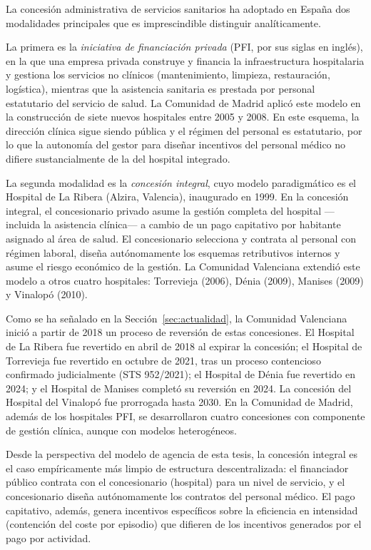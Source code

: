 La concesión administrativa de servicios sanitarios ha adoptado en España dos modalidades principales que es imprescindible distinguir analíticamente.

La primera es la \textit{iniciativa de financiación privada} (PFI, por sus siglas en inglés), en la que una empresa privada construye y financia la infraestructura hospitalaria y gestiona los servicios no clínicos (mantenimiento, limpieza, restauración, logística), mientras que la asistencia sanitaria es prestada por personal estatutario del servicio de salud. La Comunidad de Madrid aplicó este modelo en la construcción de siete nuevos hospitales entre 2005 y 2008. En este esquema, la dirección clínica sigue siendo pública y el régimen del personal es estatutario, por lo que la autonomía del gestor para diseñar incentivos del personal médico no difiere sustancialmente de la del hospital integrado.

La segunda modalidad es la \textit{concesión integral}, cuyo modelo paradigmático es el Hospital de La Ribera (Alzira, Valencia), inaugurado en 1999. En la concesión integral, el concesionario privado asume la gestión completa del hospital ---incluida la asistencia clínica--- a cambio de un pago capitativo por habitante asignado al área de salud. El concesionario selecciona y contrata al personal con régimen laboral, diseña autónomamente los esquemas retributivos internos y asume el riesgo económico de la gestión. La Comunidad Valenciana extendió este modelo a otros cuatro hospitales: Torrevieja (2006), Dénia (2009), Manises (2009) y Vinalopó (2010).

Como se ha señalado en la Sección~\ref{sec:actualidad}, la Comunidad Valenciana inició a partir de 2018 un proceso de reversión de estas concesiones. El Hospital de La Ribera fue revertido en abril de 2018 al expirar la concesión; el Hospital de Torrevieja fue revertido en octubre de 2021, tras un proceso contencioso confirmado judicialmente (STS 952/2021); el Hospital de Dénia fue revertido en 2024; y el Hospital de Manises completó su reversión en 2024. La concesión del Hospital del Vinalopó fue prorrogada hasta 2030. En la Comunidad de Madrid, además de los hospitales PFI, se desarrollaron cuatro concesiones con componente de gestión clínica, aunque con modelos heterogéneos.

Desde la perspectiva del modelo de agencia de esta tesis, la concesión integral es el caso empíricamente más limpio de estructura descentralizada: el financiador público contrata con el concesionario (hospital) para un nivel de servicio, y el concesionario diseña autónomamente los contratos del personal médico. El pago capitativo, además, genera incentivos específicos sobre la eficiencia en intensidad (contención del coste por episodio) que difieren de los incentivos generados por el pago por actividad.

